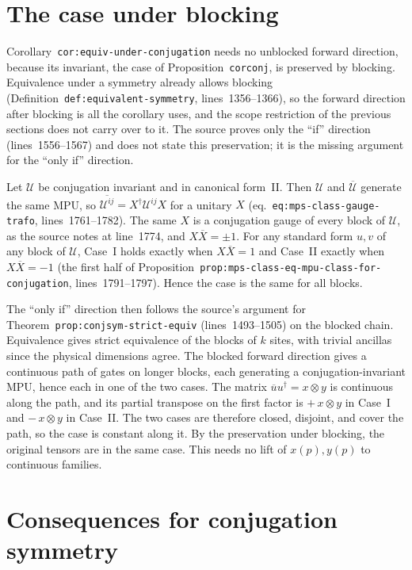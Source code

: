 \documentclass{article}
\begin{document}
\section{The case under blocking}

Corollary~\texttt{cor:equiv-under-conjugation} needs no unblocked forward
direction, because its invariant, the case of Proposition~\texttt{corconj}, is
preserved by blocking. Equivalence under a symmetry already allows blocking
(Definition~\texttt{def:equivalent-symmetry}, lines~1356--1366), so the forward
direction after blocking is all the corollary uses, and the scope restriction
of the previous sections does not carry over to it. The source proves only the ``if'' direction
(lines~1556--1567) and does not state this preservation; it is the missing
argument for the ``only if'' direction.

Let $\mathcal U$ be conjugation invariant and in canonical form~II. Then
$\mathcal U$ and $\overline{\mathcal U}$ generate the same MPU, so
$\overline{\mathcal U^{ij}}=X^\dagger\mathcal U^{ij}X$ for a unitary $X$
(eq.~\texttt{eq:mps-class-gauge-trafo}, lines~1761--1782). The same $X$ is a
conjugation gauge of every block of $\mathcal U$, as the source notes at
line~1774, and $X\overline X=\pm1$. For any standard form $u,v$ of any block of
$\mathcal U$, Case~I holds exactly when $X\overline X=1$ and Case~II exactly
when $X\overline X=-1$ (the first half of
Proposition~\texttt{prop:mps-class-eq-mpu-class-for-conjugation},
lines~1791--1797). Hence the case is the same for all blocks.

The ``only if'' direction then follows the source's argument for
Theorem~\texttt{prop:conjsym-strict-equiv} (lines~1493--1505) on the blocked
chain. Equivalence gives strict equivalence of the blocks of $k$ sites, with
trivial ancillas since the physical dimensions agree. The blocked forward
direction gives a continuous path of gates on longer blocks, each generating a
conjugation-invariant MPU, hence each in one of the two cases. The matrix
$\overline{u}u^\dagger=x\otimes y$ is continuous along the path, and its
partial transpose on the first factor is $+\,x\otimes y$ in Case~I and
$-\,x\otimes y$ in Case~II. The two cases are therefore closed, disjoint, and
cover the path, so the case is constant along it. By the preservation under
blocking, the original tensors are in the same case. This needs no lift of
$x(p),y(p)$ to continuous families.

\section{Consequences for conjugation symmetry}
\label{sec:conjugation-consequences}
\end{document}
